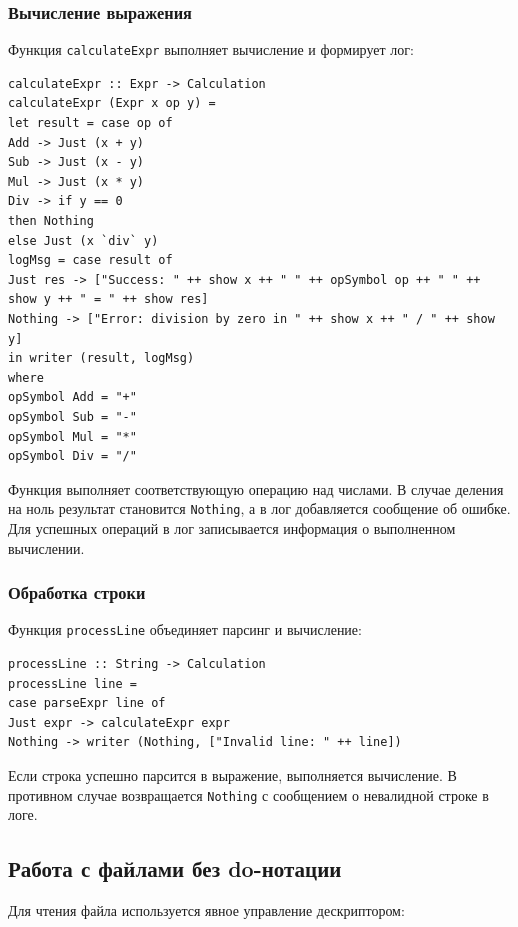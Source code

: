 \documentclass[a4paper, final]{article}
\begin{document}
\subsubsection*{Вычисление выражения}

Функция \texttt{calculateExpr} выполняет вычисление и формирует лог:

\begin{lstlisting}
calculateExpr :: Expr -> Calculation
calculateExpr (Expr x op y) = 
let result = case op of
Add -> Just (x + y)
Sub -> Just (x - y)
Mul -> Just (x * y)
Div -> if y == 0 
then Nothing
else Just (x `div` y)
logMsg = case result of
Just res -> ["Success: " ++ show x ++ " " ++ opSymbol op ++ " " ++ show y ++ " = " ++ show res]
Nothing -> ["Error: division by zero in " ++ show x ++ " / " ++ show y]
in writer (result, logMsg)
where
opSymbol Add = "+"
opSymbol Sub = "-"
opSymbol Mul = "*"
opSymbol Div = "/"
\end{lstlisting}

Функция выполняет соответствующую операцию над числами. В случае деления на ноль результат становится \texttt{Nothing}, а в лог добавляется сообщение об ошибке. Для успешных операций в лог записывается информация о выполненном вычислении.

\subsubsection*{Обработка строки}

Функция \texttt{processLine} объединяет парсинг и вычисление:

\begin{lstlisting}
processLine :: String -> Calculation
processLine line = 
case parseExpr line of
Just expr -> calculateExpr expr
Nothing -> writer (Nothing, ["Invalid line: " ++ line])
\end{lstlisting}

Если строка успешно парсится в выражение, выполняется вычисление. В противном случае возвращается \texttt{Nothing} с сообщением о невалидной строке в логе.

\subsection{Работа с файлами без do-нотации}

Для чтения файла используется явное управление дескриптором:
\end{document}
